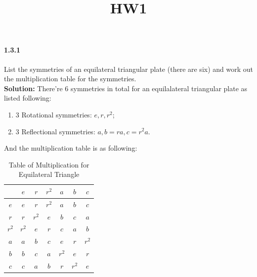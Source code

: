 \documentclass[11pt]{report}
\title{HW1}
\begin{document}
\paragraph{1.3.1}
List the symmetries of an equilateral triangular plate (there are six) and work out the multiplication table for the symmetries.\\

\textbf{Solution:} There're 6 symmetries in total for an equilalateral triangular plate as listed following:
    \begin{enumerate}
        \item 3 Rotational symmetries: $e, r, r^2$;
        \item 3 Reflectional symmetries: $a, b=ra, c=r^2a$.
    \end{enumerate}
And the multiplication table is as following:
\begin{table}[!hbp]
    \centering
    \begin{tabular}{c || c | c | c || c | c | c ||}
        
        & $e$ & $r$ & $r^2$ & $a$ & $b$ & $c$\\
        \hline
        \hline
           
           $e$ & $e$ & $r$ & $r^2$ & $a$ & $b$ & $c$\\
        \hline
           $r$ & $r$ & $r^2$ & $e$ & $b$ & $c$ & $a$\\
        \hline
           $r^2$ & $r^2$ & $e$ & $r$ & $c$ & $a$ & $b$\\
        \hline
        \hline
            $a$ & $a$ & $b$ & $c$ & $e$ & $r$ & $r^2$\\
        \hline
            $b$ & $b$ & $c$ & $a$ & $r^2$ & $e$ & $r$\\
        \hline
            $c$ & $c$ & $a$ & $b$ & $r$ & $r^2$ & $e$\\        
        \hline\hline
    \end{tabular}
    \caption{Table of Multiplication for Equilateral Triangle}
\end{table}
\end{document}
